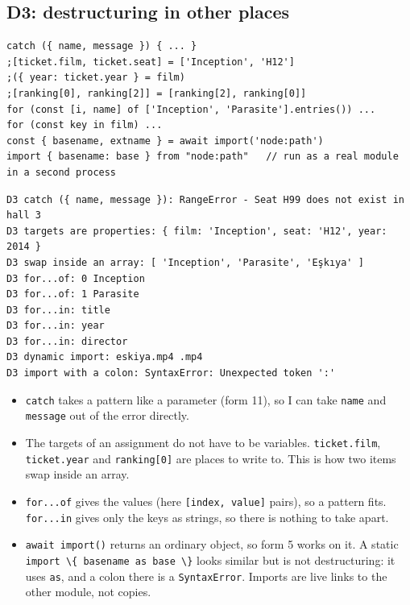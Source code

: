 \documentclass[
]{article}
\newcommand{\passthrough}[1]{#1}
\providecommand{\tightlist}{%
  \setlength{\itemsep}{0pt}\setlength{\parskip}{0pt}}
\begin{document}
\hypertarget{d3-destructuring-in-other-places}{%
\subsection{D3: destructuring in other
places}\label{d3-destructuring-in-other-places}}

\begin{lstlisting}
catch ({ name, message }) { ... }
;[ticket.film, ticket.seat] = ['Inception', 'H12']
;({ year: ticket.year } = film)
;[ranking[0], ranking[2]] = [ranking[2], ranking[0]]
for (const [i, name] of ['Inception', 'Parasite'].entries()) ...
for (const key in film) ...
const { basename, extname } = await import('node:path')
import { basename: base } from "node:path"   // run as a real module in a second process
\end{lstlisting}

\begin{lstlisting}
D3 catch ({ name, message }): RangeError - Seat H99 does not exist in hall 3
D3 targets are properties: { film: 'Inception', seat: 'H12', year: 2014 }
D3 swap inside an array: [ 'Inception', 'Parasite', 'Eşkıya' ]
D3 for...of: 0 Inception
D3 for...of: 1 Parasite
D3 for...in: title
D3 for...in: year
D3 for...in: director
D3 dynamic import: eskiya.mp4 .mp4
D3 import with a colon: SyntaxError: Unexpected token ':'
\end{lstlisting}

\begin{itemize}
\tightlist
\item
  \passthrough{\lstinline!catch!} takes a pattern like a parameter (form
  11), so I can take \passthrough{\lstinline!name!} and
  \passthrough{\lstinline!message!} out of the error directly.
\item
  The targets of an assignment do not have to be variables.
  \passthrough{\lstinline!ticket.film!},
  \passthrough{\lstinline!ticket.year!} and
  \passthrough{\lstinline!ranking[0]!} are places to write to. This is
  how two items swap inside an array.
\item
  \passthrough{\lstinline!for...of!} gives the values (here
  \passthrough{\lstinline![index, value]!} pairs), so a pattern fits.
  \passthrough{\lstinline!for...in!} gives only the keys as strings, so
  there is nothing to take apart.
\item
  \passthrough{\lstinline!await import()!} returns an ordinary object,
  so form 5 works on it. A static
  \passthrough{\lstinline!import \{ basename as base \}!} looks similar
  but is not destructuring: it uses \passthrough{\lstinline!as!}, and a
  colon there is a \passthrough{\lstinline!SyntaxError!}. Imports are
  live links to the other module, not copies.
\end{itemize}
\end{document}
